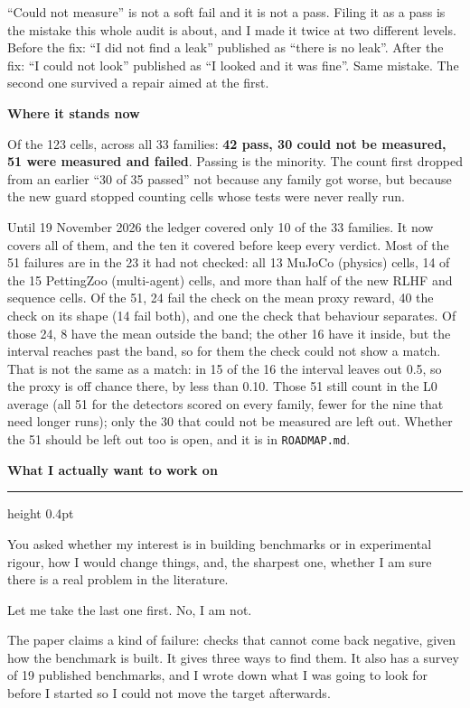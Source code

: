 \documentclass[11pt,a4paper]{article}
\newcommand{\code}[1]{\texttt{\small #1}}
\newcommand{\heading}[1]{%
  \par\vspace{1.5em}%
  \phantomsection\addcontentsline{toc}{section}{#1}%
  {\sffamily\bfseries\large #1}%
  \par\vspace{0.15em}%
  \hrule height 0.4pt%
  \par\vspace{0.5em}%
}
\newcommand{\subhead}[1]{%
  \par\vspace{0.9em}%
  {\sffamily\bfseries #1}%
  \par\vspace{0.15em}%
}
\begin{document}
``Could not measure'' is not a soft fail and it is not a pass. Filing it as a pass
is the mistake this whole audit is about, and I made it twice at two different
levels. Before the fix: ``I did not find a leak'' published as ``there is no
leak''. After the fix: ``I could not look'' published as ``I looked and it was
fine''. Same mistake. The second one survived a repair aimed at the first.

\subhead{Where it stands now}
Of the 123 cells, across all 33 families: \textbf{42 pass, 30 could not be
measured, 51 were measured and failed}. Passing is the minority. The count first
dropped from an earlier ``30 of 35 passed'' not because any family got worse, but
because the new guard stopped counting cells whose tests were never really run.

Until 19 November 2026 the ledger covered only 10 of the 33 families. It now
covers all of them, and the ten it covered before keep every verdict. Most of the
51 failures are in the 23 it had not checked: all 13 MuJoCo (physics) cells, 14 of
the 15 PettingZoo (multi-agent) cells, and more than half of the new RLHF and
sequence cells. Of the 51, 24 fail the check on the mean proxy reward, 40 the
check on its shape (14 fail both), and one the check that behaviour separates.
Of those 24, 8 have the mean outside the band; the other 16 have it inside, but the
interval reaches past the band, so for them the check could not show a match. That
is not the same as a match: in 15 of the 16 the interval leaves out 0.5, so the
proxy is off chance there, by less than 0.10.
Those 51 still count in the L0 average (all 51 for the detectors scored on every
family, fewer for the nine that need longer runs); only the 30 that could not be
measured are left out. Whether the 51 should be left out too is open, and it is in
\code{ROADMAP.md}.

\heading{What I actually want to work on}
\label{h:point3}

You asked whether my interest is in building benchmarks or in experimental rigour,
how I would change things, and, the sharpest one, whether I am sure there is a real
problem in the literature.

Let me take the last one first. No, I am not.

The paper claims a kind of failure: checks that cannot come back negative, given
how the benchmark is built. It gives three ways to find them. It also has a survey
of 19 published benchmarks, and I wrote down what I was going to look for before I
started so I could not move the target afterwards.
\end{document}
